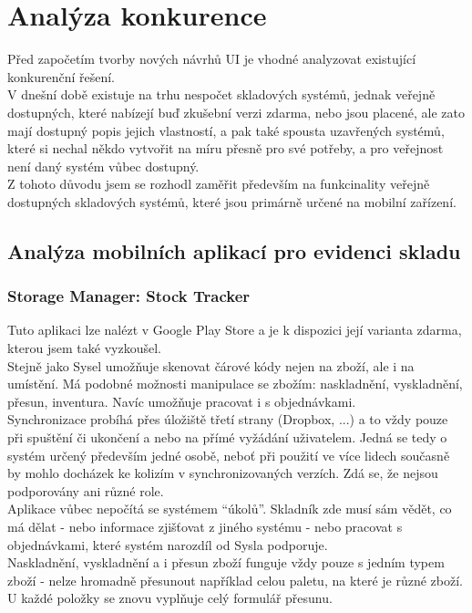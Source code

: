 
\section{Analýza konkurence}

Před započetím tvorby nových návrhů UI je vhodné analyzovat existující konkurenční řešení.\\
V dnešní době existuje na trhu nespočet skladových systémů, jednak veřejně dostupných, které nabízejí buď zkušební verzi zdarma, nebo jsou placené, ale zato mají dostupný popis jejich vlastností, a pak také spousta uzavřených systémů, které si nechal někdo vytvořit na míru přesně pro své potřeby, a pro veřejnost není daný systém vůbec dostupný.\\
Z tohoto důvodu jsem se rozhodl zaměřit především na funkcinality veřejně dostupných skladových systémů, které jsou primárně určené na mobilní zařízení.\\

\subsection{Analýza mobilních aplikací pro evidenci skladu}

\subsubsection{Storage Manager: Stock Tracker}

Tuto aplikaci lze nalézt v Google Play Store a je k dispozici její varianta zdarma, kterou jsem také vyzkoušel.\\
Stejně jako Sysel umožňuje skenovat čárové kódy nejen na zboží, ale i na umístění. Má podobné možnosti manipulace se zbožím: naskladnění, vyskladnění, přesun, inventura. Navíc umožňuje pracovat i s objednávkami.\\
Synchronizace probíhá přes úložiště třetí strany (Dropbox, ...) a to vždy pouze při spuštění či ukončení a nebo na přímé vyžádání uživatelem. Jedná se tedy o systém určený především jedné osobě, neboť při použití ve více lidech současně by mohlo docházek ke kolizím v synchronizovaných verzích. Zdá se, že nejsou podporovány ani různé role.\\
Aplikace vůbec nepočítá se systémem “úkolů”. Skladník zde musí sám vědět, co má dělat - nebo informace zjišťovat z jiného systému - nebo pracovat s objednávkami, které systém narozdíl od Sysla podporuje.\\
Naskladnění, vyskladnění a i přesun zboží funguje vždy pouze s jedním typem zboží - nelze hromadně přesunout například celou paletu, na které je různé zboží. U každé položky se znovu vyplňuje celý formulář přesunu.\\

